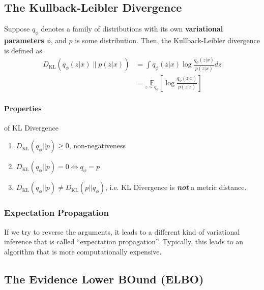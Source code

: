 \documentclass[11pt]{article}
\newcommand{\kl}{\mathrm{KL}}
\begin{document}
\subsection{The Kullback-Leibler Divergence}
Suppose $q_\phi$ denotes a family of distributions with its own \textbf{variational parameters} $\phi$, and $p$ is some distribution. Then, the Kullback-Leibler divergence is defined as
\begin{align}
    D_{\mathrm{K L}}\left(q_{\phi}(z | x) \| p(z | x)\right)
    &=\int q_{\phi}(z | x) \log \frac{q_{\phi}(z | x)}{p(z | x)} d z \\
    &=\underset{z \sim q_{\phi}}{\mathbb{E}} \left[ \log \frac{q_{\phi}(z | x)}{p(z | x)} \right]
\end{align}

\paragraph{Properties} of KL Divergence
\begin{enumerate}
    \item $D_\kl (q_\phi || p) \geq 0$, non-negativeness
    \item $D_\kl (q_\phi || p) = 0 \iff q_\phi = p$
    \item $D_\kl (q_\phi || p) \neq D_\kl (p || q_\phi)$, i.e. KL Divergence is \textit{\textbf{not}} a metric distance. 
\end{enumerate}

\subsubsection{Expectation Propagation}
If we try to reverse the arguments, it leads to a different kind of variational inference that is called ``expectation propagation''. Typically, this leads to an algorithm that is more computationally expensive. 

\subsection{The Evidence Lower BOund (ELBO)}
\end{document}
